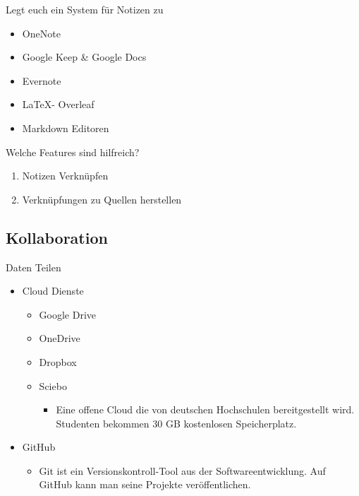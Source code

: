 \documentclass[aspectratio=169]{beamer}
\begin{document}
\begin{frame}{Legt euch ein System für Notizen zu}
    \begin{block}
           
    \end{block}    
    \begin{itemize}
        \item OneNote
        \item Google Keep \& Google Docs
        \item Evernote
        \item \LaTeX - Overleaf
        \item Markdown Editoren    
    \end{itemize}
\end{frame}
\begin{frame}{Welche Features sind hilfreich?}
    \begin{enumerate}
        \item Notizen Verknüpfen
        \item Verknüpfungen zu Quellen herstellen
        
    \end{enumerate}
    
\end{frame}

\subsection{Kollaboration}

\begin{frame}{Daten Teilen}
    \begin{itemize}
        \item Cloud Dienste
            \begin{itemize}
                \item Google Drive
                \item OneDrive
                \item Dropbox
                \item Sciebo
                \begin{itemize}
                    \item Eine offene Cloud die von deutschen Hochschulen bereitgestellt wird. Studenten bekommen 30 GB kostenlosen Speicherplatz.
                \end{itemize}
            \end{itemize}
        \item GitHub 
        \begin{itemize}
            \item Git ist ein Versionskontroll-Tool aus der Softwareentwicklung. Auf GitHub kann man seine Projekte veröffentlichen.
        \end{itemize}
    \end{itemize}    
\end{frame}
\end{document}
